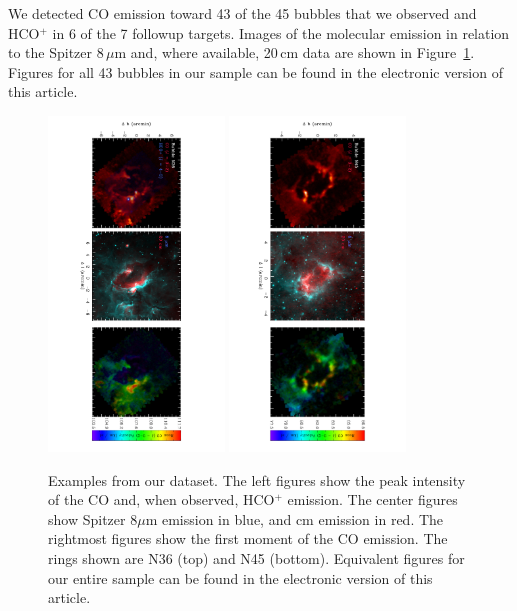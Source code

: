 We detected CO emission toward 43 of the 45 bubbles that we observed
and HCO$^+$ in 6 of the 7 followup targets.
Images of the molecular emission in relation to the Spitzer $8\,\mu$m
and, where available, 20\,cm data are shown in Figure~\ref{fig:bubbleExample}.
Figures for all 43 bubbles in our sample can be found in the electronic version
of this article.

\begin{figure}
\includegraphics[height=3.5in, trim= 30mm 0mm 10mm 0mm, angle=90]{036}
\includegraphics[height=3.5in, trim= 10mm 0mm 20mm 0mm, angle=90]{045}
\caption{Examples from our dataset. The left figures show the peak intensity of the CO and, when observed, HCO$^+$ emission.
The center figures show Spitzer $8 \mu$m emission in blue, and  cm emission in red. The rightmost figures show the
first moment of the CO emission. The rings shown
are N36 (top) and N45 (bottom). Equivalent figures for our
entire sample can be found in the electronic version of this article.}
\label{fig:bubbleExample}
\end{figure}

